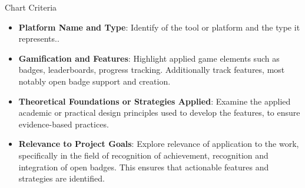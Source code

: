 Chart Criteria
\begin{itemize}
    \item \textbf{Platform Name and Type}:  Identify of the tool or platform and the type it represents..
    \item \textbf{Gamification and Features}:  Highlight applied game elements such as badges, leaderboards, progress tracking. Additionally track features, most notably open badge support and creation.
    \item \textbf{Theoretical Foundations or Strategies Applied}:  Examine the applied academic or practical design principles used to develop the features, to ensure evidence-based practices.
    \item \textbf{Relevance to Project Goals}: Explore relevance of application to the work, specifically in the field of recognition of achievement, recognition and integration of open badges. This ensures that actionable features and strategies are identified.
\end{itemize}


